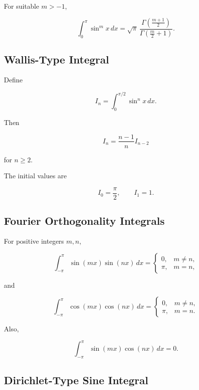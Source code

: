 For suitable \(m>-1\),

\[
\boxed{
\int_0^\pi
\sin^m x
\,dx
=
\sqrt{\pi}
\,
\frac{
\Gamma
\left(
\frac{m+1}{2}
\right)
}{
\Gamma
\left(
\frac{m}{2}+1
\right)
}.
}
\]

\subsection{Wallis-Type Integral}
\label{subsec:wallis-integral-reference}

Define

\[
I_n
=
\int_0^{\pi/2}
\sin^n x
\,dx.
\]

Then

\[
\boxed{
I_n
=
\frac{
n-1
}{
n
}
I_{n-2}
}
\]

for \(n\geq2\).

The initial values are

\[
\boxed{
I_0=\frac{\pi}{2},
\qquad
I_1=1.
}
\]

\subsection{Fourier Orthogonality Integrals}
\label{subsec:fourier-orthogonality-integrals}

For positive integers \(m,n\),

\[
\boxed{
\int_{-\pi}^{\pi}
\sin(mx)\sin(nx)
\,dx
=
\begin{cases}
0, & m\neq n,\\
\pi, & m=n,
\end{cases}
}
\]

and

\[
\boxed{
\int_{-\pi}^{\pi}
\cos(mx)\cos(nx)
\,dx
=
\begin{cases}
0, & m\neq n,\\
\pi, & m=n.
\end{cases}
}
\]

Also,

\[
\boxed{
\int_{-\pi}^{\pi}
\sin(mx)\cos(nx)
\,dx
=
0.
}
\]

\subsection{Dirichlet-Type Sine Integral}
\label{subsec:dirichlet-sine-integral}

